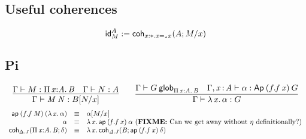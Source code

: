 \subsection{Useful coherences}

\[\mathsf{id}^{A}_{M}:=\mathsf{coh}_{x:\mathord{*}.x =_{\mathord{*}} x} ({A};{M/x})\]

\subsection{Pi}

\begin{small}
  \[
  \infer{\ofglob{\Gamma}{\app{M}{N}}{\subst{B}{N}{x}}}
  {\ofglob{\Gamma}{M}{\picl{x}{A}{B}} & \ofglob{\Gamma}{N}{A}} \qquad
  \infer{\ofglob{\Gamma}{\ulam{x}{\alpha}}{G}}
  {\wfglob{\Gamma}{G}{\picl{x}{A}{B}} &
    \ofglob{\Gamma,\tptm{x}{A}}{\alpha}{\Ap{(f.\app{f}{x})}{G}}}
  \]
\[
  \begin{array}{rcl}
  \mathsf{ap} \: {(f.\mathit{f \: M})} \: {(\mathit{\lambda\,x.\,\alpha})} & \equiv & \mathit{\alpha} [ M/x ] \\

\alpha & \equiv & \mathit{\lambda\,x.\,\mathsf{ap} \: {(f.\mathit{f \: x})} \: {\alpha}} \text{ (\textbf{FIXME:} Can we get away without $\eta$ definitionally?)} \\

\mathsf{coh}_{\Delta.J} ({\textnormal{$\Pi$}\,\mathit{x} \mathit{:} \mathit{A}.\,\mathit{B}};{\delta}) & \equiv & \mathit{\lambda\,x.\,\mathsf{coh}_{\Delta.J} ({B};{\mathsf{ap} \: {(f.\mathit{f \: x})} \: {\delta}})} \\
 
\end{array}
\]
\end{small}


